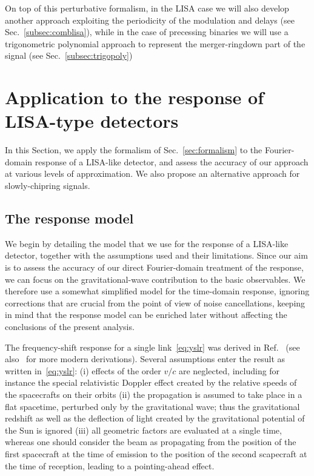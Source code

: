 \documentclass[aps,showpacs,twocolumn,
prd,superscriptaddress,nofootinbib]{revtex4-1}
\begin{document}
On top of this perturbative formalism, in the LISA case we will also develop another approach exploiting the periodicity of the modulation and delays (see Sec.~\ref{subsec:comblisa}), while in the case of precessing binaries we will use a trigonometric polynomial approach to represent the merger-ringdown part of the signal (see Sec.~\ref{subsec:trigopoly})


\section{Application to the response of LISA-type detectors}
\label{sec:LISA}

In this Section, we apply the formalism of Sec.~\ref{sec:formalism} to the Fourier-domain response of a LISA-like detector, and assess the accuracy of our approach at various levels of approximation. We also propose an alternative approach for slowly-chipring signals.


\subsection{The response model}
\label{subsec:modelLISA}

We begin by detailing the model that we use for the response of a LISA-like detector, together with the assumptions used and their limitations. Since our aim is to assess the accuracy of our direct Fourier-domain treatment of the response, we can focus on the gravitational-wave contribution to the basic observables. We therefore use a somewhat simplified model for the time-domain response, ignoring corrections that are crucial from the point of view of noise cancellations, keeping in mind that the response model can be enriched later without affecting the conclusions of the present analysis.

The frequency-shift response for a single link~\eqref{eq:yslr} was derived in Ref.~\cite{EW75} (see also~\cite{RCP04, Finn08, Cornish09} for more modern derivations). Several assumptions enter the result as written in~\eqref{eq:yslr}: (i) effects of the order $v/c$ are neglected, including for instance the special relativistic Doppler effect created by the relative speeds of the spacecrafts on their orbits (ii) the propagation is assumed to take place in a flat spacetime, perturbed only by the gravitational wave; thus the gravitational redshift as well as the deflection of light created by the gravitational potential of the Sun is ignored (iii) all geometric factors are evaluated at a single time, whereas one should consider the beam as propagating from the position of the first spacecraft at the time of emission to the position of the second scapecraft at the time of reception, leading to a pointing-ahead effect.
\end{document}

